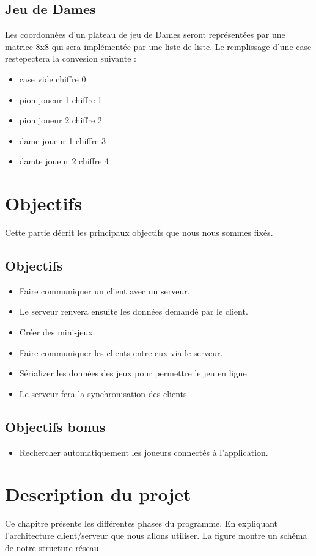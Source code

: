 \documentclass{report}
\begin{document}
\section{Jeu de Dames}
Les coordonnées d'un plateau de jeu de Dames seront représentées par une matrice 8x8 qui sera implémentée par une liste de liste.
Le remplissage d'une case restepectera la convesion suivante :
\begin{itemize}
	\item case vide \tabto{4cm} chiffre 0
	\item pion joueur 1 \tabto{4cm} chiffre 1
	\item pion joueur 2  \tabto{4cm} chiffre 2
	\item dame joueur 1 \tabto{4cm} chiffre 3
	\item damte joueur 2 \tabto{4cm} chiffre 4
\end{itemize}





\chapter{Objectifs}
Cette partie décrit les principaux objectifs que nous nous sommes fixés.
\section{Objectifs}\label{objectifs}
\begin{itemize}
	\item Faire communiquer un client avec un serveur.
	\item Le serveur renvera ensuite les données demandé par le client.
	\item Créer des mini-jeux.
	\item Faire communiquer les clients entre eux via le serveur.
	\item Sérializer les données des jeux pour permettre le jeu en ligne.
	\item Le serveur fera la synchronisation des clients.
\end{itemize}
\section{Objectifs bonus}\label{objectifs-bonus}
\begin{itemize}
	\item Rechercher automatiquement les joueurs connectés à l'application.
\end{itemize}
\chapter{Description du projet}\label{desciption-projet}
Ce chapitre présente les différentes phases du programme. En expliquant l'architecture client/serveur que nous allons utiliser. La figure montre un schéma de notre
structure réseau.
\end{document}
